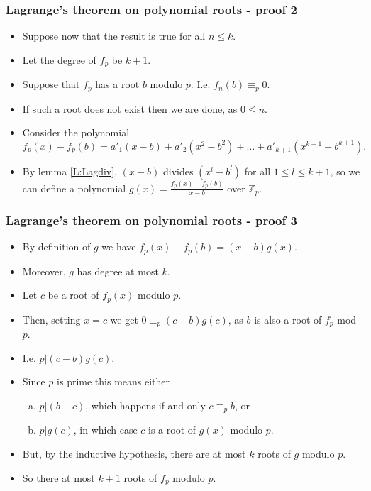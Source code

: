 \documentclass[handout]{beamer}
\newcommand{\bZ}{\mathbb{Z}}
\begin{document}
\begin{frame}
\frametitle{Lagrange's theorem on polynomial roots - proof 2}
\begin{itemize}
\item Suppose now that the result is true for all $n\leq k$. 
\vspace{0.2cm} 
\item Let the degree of $f_p$ be $k+1$. 
\vspace{0.2cm} 
\item Suppose that $f_p$ has a root $b$ modulo $p$. I.e. $f_n(b)\equiv_p 0$. 
\vspace{0.2cm} 
\item If such a root does not exist then we are done, as $0\leq n$. 
\vspace{0.2cm} 
\item Consider the polynomial 
\[f_p(x)- f_p(b) = a'_1(x-b) + a'_2(x^2-b^2) +\ldots + a'_{k+1}(x^{k+1}-b^{k+1}).\]
\item By lemma \ref{L:Lagdiv}, $(x-b)$ divides $(x^l-b^l)$ for all $1\leq l\leq k+1$, so we can define a polynomial $g(x)=\frac{f_p(x) - f_p(b)}{x-b}$ over $\bZ_p$. 
\end{itemize}
\end{frame}

\begin{frame}
\frametitle{Lagrange's theorem on polynomial roots - proof 3}

\begin{itemize}
\item By definition of $g$ we have $f_p(x)-f_p(b) = (x-b)g(x)$. 
\vspace{0.2cm} 
\item Moreover, $g$ has degree at most $k$. 
\vspace{0.2cm} 
\item Let $c$ be a root of $f_p(x)$ modulo $p$. 
\vspace{0.2cm} 
\item Then, setting $x=c$ we get $0 \equiv_p (c-b)g(c)$, as $b$ is also a root of $f_p$ mod $p$. 
\vspace{0.2cm} 
\item I.e. $p|(c-b)g(c)$. 
\vspace{0.2cm} 
\item Since $p$ is prime this means either 
\begin{enumerate}[a)]
\item $p|(b-c)$, which happens if and only $c\equiv_p b$, or
\item $p|g(c)$, in which case $c$ is a root of $g(x)$ modulo $p$.
\end{enumerate} 
\vspace{0.2cm} 
\item But, by the inductive hypothesis, there are at most $k$ roots of $g$ modulo $p$. 
\vspace{0.2cm} 
\item So there at most $k+1$ roots of $f_p$ modulo $p$. 
\end{itemize}
\end{frame}
\end{document}

